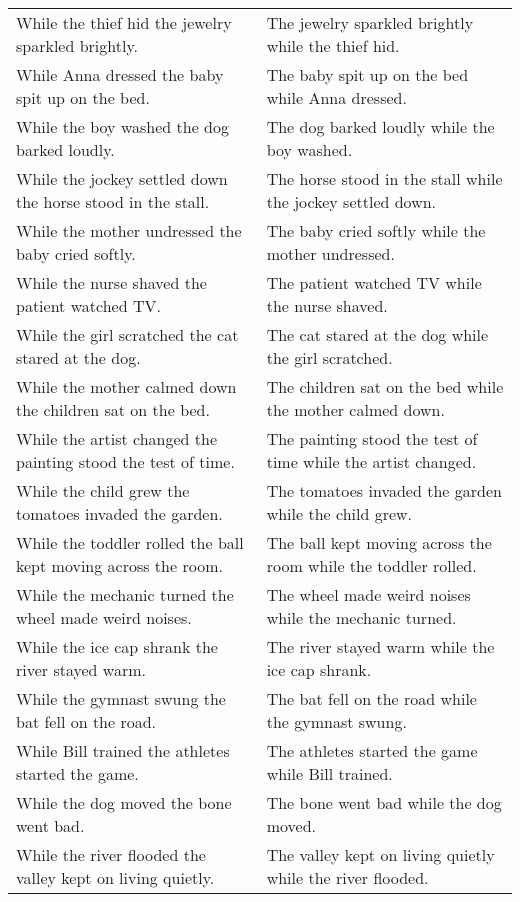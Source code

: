 \begin{center}
\begin{xtabular*}{\textwidth}{p{0.45\textwidth}|p{0.45\textwidth}}
        While the thief hid the jewelry sparkled brightly. & The jewelry sparkled brightly while the thief hid. \\
        While Anna dressed the baby spit up on the bed. & The baby spit up on the bed while Anna dressed. \\
        While the boy washed the dog barked loudly. & The dog barked loudly while the boy washed. \\
        While the jockey settled down the horse stood in the stall. & The horse stood in the stall while the jockey settled down. \\
        While the mother undressed the baby cried softly. & The baby cried softly while the mother undressed. \\
        While the nurse shaved the patient watched TV. & The patient watched TV while the nurse shaved. \\
        While the girl scratched the cat stared at the dog. & The cat stared at the dog while the girl scratched. \\
        While the mother calmed down the children sat on the bed. & The children sat on the bed while the mother calmed down. \\
        While the artist changed the painting stood the test of time. & The painting stood the test of time while the artist changed. \\
        While the child grew the tomatoes invaded the garden. & The tomatoes invaded the garden while the child grew. \\
        While the toddler rolled the ball kept moving across the room. & The ball kept moving across the room while the toddler rolled. \\
        While the mechanic turned the wheel made weird noises. & The wheel made weird noises while the mechanic turned. \\
        While the ice cap shrank the river stayed warm. & The river stayed warm while the ice cap shrank. \\
        While the gymnast swung the bat fell on the road. & The bat fell on the road while the gymnast swung. \\
        While Bill trained the athletes started the game. & The athletes started the game while Bill trained. \\
        While the dog moved the bone went bad. & The bone went bad while the dog moved. \\
        While the river flooded the valley kept on living quietly. & The valley kept on living quietly while the river flooded. \\

\end{xtabular*}
\end{center}
